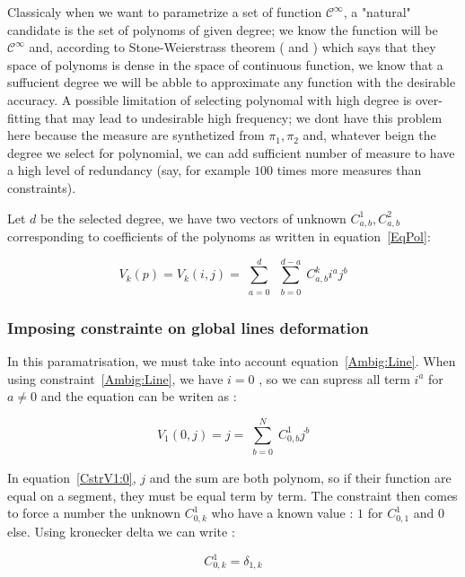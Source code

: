 \documentclass{ipol}
\begin{document}
Classicaly when we want to parametrize a set of function  $\mathcal{C}^{\infty}$,
a "natural" candidate is the set of polynoms of given degree; we know the function will be
$\mathcal{C}^{\infty}$ and, according to Stone-Weierstrass theorem (\cite{Weierstrass1885} and \cite{Stone1937})
which says that they space of polynoms is dense in the space of continuous function, we know that a suffucient
degree we will be abble to approximate any function with the desirable accuracy. A possible
limitation of selecting polynomal with high degree is over-fitting that may lead to
undesirable high frequency; we dont have this problem here because  the measure
are synthetized from $\pi_1,\pi_2$ and, whatever beign the degree we select for polynomial,
we can add sufficient number of measure to have a high level of redundancy (say, for example
$100$ times more measures than constraints).

Let $d$ be the selected degree, we have two vectors of unknown $C^1_{a,b},C^2_{a,b}$ 
corresponding to coefficients of the polynoms as written in equation~\ref{EqPol}:


\begin{equation}
   V_k(p) = V_k(i,j) =  \sum\limits_{\substack{a=0}}^d  \sum\limits_{\substack{b=0}}^{d-a}  C^k_{a,b}  i^a j^b \label{EqPol}
\end{equation}
   
\subsubsection{Imposing constrainte on global lines deformation}

In this paramatrisation, we must take into account equation~\ref{Ambig:Line}.
When using constraint~\ref{Ambig:Line}, we have  $i=0$ , so we can supress all term  $i^a$ for $a\neq 0$
and the equation can be writen as :


\begin{equation}
    V_1(0,j) =  j =   \sum\limits_{\substack{b=0}}^{N}  C^1_{0,b}  j^b  \label{CstrV1:0}
\end{equation}

In equation~\ref{CstrV1:0}, $j$ and the  sum are both polynom, so if their function are equal on a segment, they
must be equal term by term. The constraint then comes to force a number the
unknown $C^1_{0,k}$ who have a known value  : $1$ for $C^1_{0,1}$ and $0$ else.
Using kronecker delta we can write :

\begin{equation}
         C^1_{0,k} = \delta_{1,k} \label{CstrV1:1}
\end{equation}
\end{document}
